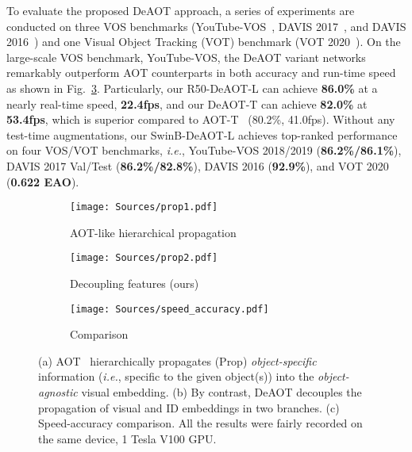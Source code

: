 \documentclass{article}
\def\ie{\emph{i.e.}}
\begin{document}
To evaluate the proposed DeAOT approach, a series of experiments are conducted on three VOS benchmarks (YouTube-VOS~\cite{youtubevos}, DAVIS 2017~\cite{davis2017}, and DAVIS 2016~\cite{davis2016}) and one Visual Object Tracking (VOT) benchmark (VOT 2020~\cite{vot2020}). On the large-scale VOS benchmark, YouTube-VOS, the DeAOT variant networks remarkably outperform AOT counterparts in both accuracy and run-time speed as shown in Fig.~\ref{fig:speed_acc}. Particularly, our R50-DeAOT-L can achieve \textbf{86.0\%} at a nearly real-time speed, \textbf{22.4fps}, and our DeAOT-T can achieve \textbf{82.0\%} at \textbf{53.4fps}, which is superior compared to AOT-T~\cite{aot} (80.2\%, 41.0fps). Without any test-time augmentations, our SwinB-DeAOT-L achieves top-ranked performance on four VOS/VOT benchmarks, \ie, YouTube-VOS 2018/2019 (\textbf{86.2\%/86.1\%}), DAVIS 2017 Val/Test (\textbf{86.2\%/82.8\%}), DAVIS 2016 (\textbf{92.9\%}), and VOT 2020 (\textbf{0.622 EAO}).

\begin{figure}[t!]
\begin{center}

\begin{subfigure}[b]{.35\textwidth}
			\centering
			\texttt{[image: Sources/prop1.pdf]}
			\caption{AOT-like hierarchical propagation}\label{fig:aot_prop}
\end{subfigure}
\begin{subfigure}[b]{.39\textwidth}
			\centering
			\texttt{[image: Sources/prop2.pdf]}
			\caption{Decoupling features (ours)}\label{fig:deaot_prop}
\end{subfigure}
\begin{subfigure}[b]{.24\textwidth}
			\centering
			\texttt{[image: Sources/speed\_accuracy.pdf]}
			\caption{Comparison}\label{fig:speed_acc}
\end{subfigure}

\end{center}

\caption{(a) AOT~\cite{aot} hierarchically propagates (Prop) \textit{object-specific} information (\ie, specific to the given object(s)) into the \textit{object-agnostic} visual embedding. (b) By contrast, DeAOT decouples the propagation of visual and ID embeddings in two branches. (c) Speed-accuracy comparison. All the results were fairly recorded on the same device, 1 Tesla V100 GPU.} \label{fig:better}
\end{figure} 
\end{document}
